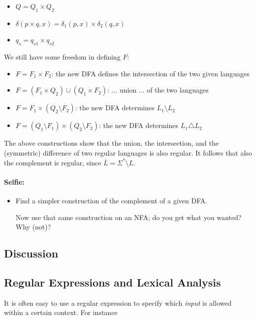 \begin{itemize}
\item $Q = Q_1 \times Q_2$
\item $\delta(p \times q,x) = \delta_1(p,x) \times \delta_2(q,x)$
\item $q_s = q_{s1} \times q_{s2}$
\end{itemize}

We still have some freedom in defining $F$:

\begin{itemize}
\item $F = F_1 \times F_2$: the new DFA defines the intersection of
  the two given languages
\item $F = (F_1 \times Q_2) \cup (Q_1 \times F_2)$: ... union ...
of the two languages
\item $F = F_1 \times (Q_2 \setminus F_2)$: the new DFA determines
 $L_1 \setminus L_2$
\item $F = (Q_1 \setminus F_1) \times (Q_2 \setminus F_2)$: the new
  DFA determines $L_1 \triangle L_2$
\end{itemize}

The above constructions show that the union, the intersection, and the
(symmetric) difference of two regular languages is also regular. It
follows that also the complement is regular, since
%
$\overline{L} = \Sigma^* \setminus L$.

\paragraph{Selfie:}
\begin{itemize}
\item[]
Find a simpler construction of the complement of a given DFA.

Now use that same construction on an NFA; do you get what you wanted?
Why (not)?
\end{itemize}

\subsection{Discussion}

\subsection{Regular Expressions and Lexical Analysis}

It is often easy to use a regular expression to specify which {\em
  input} is allowed within a certain context. For instance


